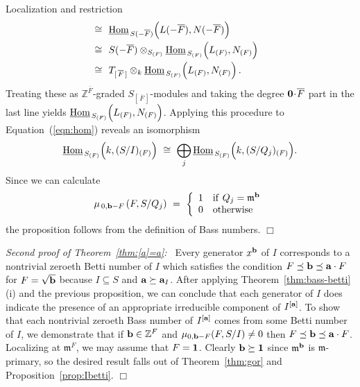 \documentclass[12pt,leqno]{article}
\def\hhom{{{\underline{\rm Hom}}{\scriptscriptstyle \,}}}
\def\aa{{{\rm \bf a}}}
\def\bb{{{\rm \bf b}}}
\def\mm{{\mathfrak m}}
\def\ZZ{{\mathbb Z}}
\begin{document}
\begin{section}{Localization and restriction}
$$\begin{array}{r@{\ \ \protect\cong\ \ }l}
&	\hhom_{S(-{\overline F})}
		\Bigl( L(-{\overline F}),N(-{\overline F}) \Bigr)
\cr
&	S(-{\overline F}) \otimes_{S_{(F)}} \hhom_{S_{(F)}}
		\Bigl( L_{(F)},N_{(F)} \Bigr)
	\phantom{\biggl(\biggr)}
\cr
&	T_{[\,{\overline F}\,]} \otimes_k \hhom_{S_{(F)}}
		\Bigl( L_{(F)},N_{(F)} \Bigr)\,.
\end{array}
$$
Treating these as $\ZZ^{\overline F}$-graded $S_{[\,{\overline
F}\,]}$-modules and taking the degree ${\bf 0} \!\cdot\! {\overline F}$
part in the last line yields $\hhom_{S_{(F)}} \Bigl( L_{(F)},N_{(F)}
\Bigr)$.  Applying this procedure to Equation~(\ref{eqn:hom}) reveals an
isomorphism
$$
  \hhom_{S_{(F)}} \Bigl(k,(S/I)_{(F)}\Bigr)\ \cong\ 
  \bigoplus_j \hhom_{S_{(F)}} \Bigl(k,(S/Q_j)_{(F)}\Bigr).
$$
Since we can calculate
$$
  \mu_{\,0,\bb - F\,}(F,S/Q_j)\ =\ \left\{\begin{array}{ll}
		1 & {\rm if}\ Q_j = \mm^\bb \cr
		0 & {\rm otherwise} \end{array}
	\right.
$$
the proposition follows from the definition of Bass numbers.
%
\hfill
$\Box$
\vskip 2mm

\noindent
{\it Second proof of Theorem~\ref{thm:[a]=a}:\ } Every generator $x^\bb$
of $I$ corresponds to a nontrivial zeroeth Betti number of $I$ which
satisfies the condition $F \preceq \bb \preceq \aa \cdot F$ for $F =
\sqrt\bb$ because $I \subseteq S$ and $\aa \succeq \aa_I$.  After
applying Theorem~\ref{thm:bass-betti}(i) and the previous proposition, we
can conclude that each generator of $I$ does indicate the presence of an
appropriate irreducible component of $I^{[\aa]}$.  To show that each
nontrivial zeroeth Bass number of $I^{[\aa]}$ comes from some Betti
number of $I$, we demonstrate that if $\bb \in \ZZ^F$ and $\mu_{0,\bb -
F}(F,S/I) \neq 0$ then $F \preceq \bb \preceq \aa \cdot F$.  Localizing
at $\mm^F$, we may assume that $F = {\bf 1}$.  Clearly $\bb \succeq {\bf
1}$ since $\mm^\bb$ is $\mm$-primary, so the desired result falls out of
Theorem~\ref{thm:gor} and Proposition~\ref{prop:Ibetti}.
%
\hfill
$\Box$
\vskip 2mm


\end{section}
\end{document}
